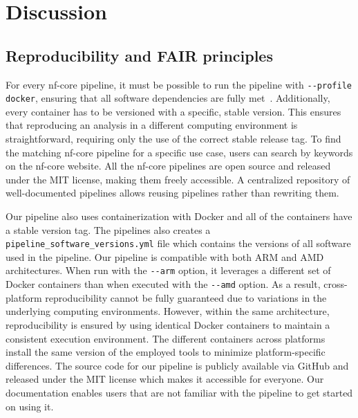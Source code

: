 \documentclass[12pt]{article}
\begin{document}
\section{Discussion}
\subsection{Reproducibility and FAIR principles}
For every nf-core pipeline, it must be possible to run the pipeline with \verb|--profile docker|, ensuring that all software dependencies are fully met~\cite{ewels2020nf}. Additionally, every container has to be versioned with a specific, stable version. This ensures that reproducing an analysis in a different computing environment is straightforward, requiring only the use of the correct stable release tag. To find the matching nf-core pipeline for a specific use case, users can search by keywords on the nf-core website. All the nf-core pipelines are open source and released under the MIT license, making them freely accessible. A centralized repository of well-documented pipelines allows reusing pipelines rather than rewriting them.

Our pipeline also uses containerization with Docker and all of the containers have a stable version tag. The pipelines also creates a \verb|pipeline_software_versions.yml| file which contains the versions of all software used in the pipeline. Our pipeline is compatible with both ARM and AMD architectures. When run with the \verb|--arm| option, it leverages a different set of Docker containers than when executed with the \verb|--amd| option. As a result, cross-platform reproducibility cannot be fully guaranteed due to variations in the underlying computing environments. However, within the same architecture, reproducibility is ensured by using identical Docker containers to maintain a consistent execution environment. The different containers across platforms install the same version of the employed tools to minimize platform-specific differences. The source code for our pipeline is publicly available via GitHub and released under the MIT license which makes it accessible for everyone. Our documentation enables users that are not familiar with the pipeline to get started on using it.
\end{document}
